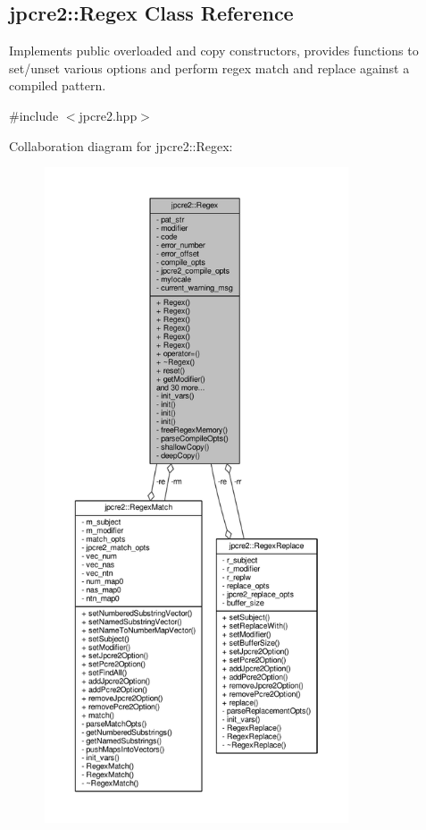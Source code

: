 \hypertarget{classjpcre2_1_1Regex}{}\subsection{jpcre2\+:\+:Regex Class Reference}
\label{classjpcre2_1_1Regex}


Implements public overloaded and copy constructors, provides functions to set/unset various options and perform regex match and replace against a compiled pattern.  




{\ttfamily \#include $<$jpcre2.\+hpp$>$}



Collaboration diagram for jpcre2\+:\+:Regex\+:
\nopagebreak
\begin{figure}[H]
\begin{center}
\leavevmode
\includegraphics[height=550pt]{classjpcre2_1_1Regex__coll__graph}
\end{center}
\end{figure}
